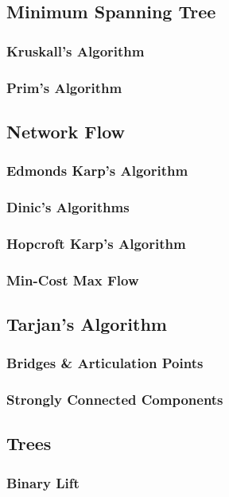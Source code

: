 \documentclass[letterpaper,11pt,twoside]{article}
\begin{document}
            \subsection{Minimum Spanning Tree}
                \subsubsection{Kruskall's Algorithm}
                \subsubsection{Prim's Algorithm}
            \subsection{Network Flow}
                \subsubsection{Edmonds Karp's Algorithm}
                \subsubsection{Dinic's Algorithms}
                \subsubsection{Hopcroft Karp's Algorithm}
                \subsubsection{Min-Cost Max Flow}
            \subsection{Tarjan's Algorithm}
                \subsubsection{Bridges \& Articulation Points}
                \subsubsection{Strongly Connected Components}
            \subsection{Trees}
                \subsubsection{Binary Lift}
\end{document}

